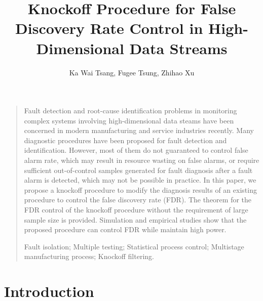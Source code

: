 \documentclass[a4paper,12pt]{article}
\title{Knockoff Procedure for False Discovery Rate Control in High-Dimensional Data Streams}
\author{Ka Wai Tsang, Fugee Tsung, Zhihao Xu}
\date{}
\begin{document}
\maketitle

\begin{quotation}
Fault detection and root-cause identification problems in monitoring complex systems involving high-dimensional data steams have been concerned in modern manufacturing and service industries recently. Many diagnostic procedures have been proposed for fault detection and identification. However, most of them do not guaranteed to control false alarm rate, which may result in resource wasting on false alarms, or require sufficient out-of-control samples generated for fault diagnosis after a fault alarm is detected, which may not be possible in practice. In this paper, we propose a knockoff procedure to modify the diagnosis results of an existing procedure to control the false discovery rate (FDR). The theorem for the FDR control of the knockoff procedure without the requirement of large sample size is provided. Simulation and empirical studies show that the proposed procedure can control FDR while maintain high power. 


\vspace{9pt}
Fault isolation; Multiple testing; Statistical process control; Multistage manufacturing process; Knockoff filtering.
\par
\end{quotation}\par


\section{Introduction}\label{introduction}
\end{document}

